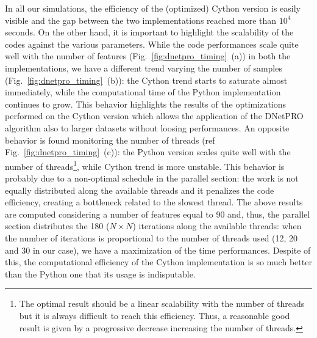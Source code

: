 \documentclass{standalone}
\begin{document}
In all our simulations, the efficiency of the (optimized) \textsf{Cython} version is easily visible and the gap between the two implementations reached more than $10^4$ seconds.
On the other hand, it is important to highlight the scalability of the codes against the various parameters.
While the code performances scale quite well with the number of features (Fig.~\ref{fig:dnetpro_timing}~(a)) in both the implementations, we have a different trend varying the number of samples (Fig.~\ref{fig:dnetpro_timing}~(b)): the \textsf{Cython} trend starts to saturate almost immediately, while the computational time of the \textsf{Python} implementation continues to grow.
This behavior highlights the results of the optimizations performed on the \textsf{Cython} version which allows the application of the \textsf{DNetPRO} algorithm also to larger datasets without loosing performances.
An opposite behavior is found monitoring the number of threads (ref Fig.~\ref{fig:dnetpro_timing}~(c)): the \textsf{Python} version scales quite well with the number of threads\footnote{
  The optimal result should be a linear scalability with the number of threads but it is always difficult to reach this efficiency.
  Thus, a reasonable good result is given by a progressive decrease increasing the number of threads.
}, while \textsf{Cython} trend is more unstable.
This behavior is probably due to a non-optimal schedule in the parallel section: the work is not equally distributed along the available threads and it penalizes the code efficiency, creating a bottleneck related to the slowest thread.
The above results are computed considering a number of features equal to 90 and, thus, the parallel section distributes the 180 ($N\times N$) iterations along the available threads: when the number of iterations is proportional to the number of threads used (12, 20 and 30 in our case), we have a maximization of the time performances.
Despite of this, the computational efficiency of the \textsf{Cython} implementation is so much better than the \textsf{Python} one that its usage is indisputable.
\end{document}

